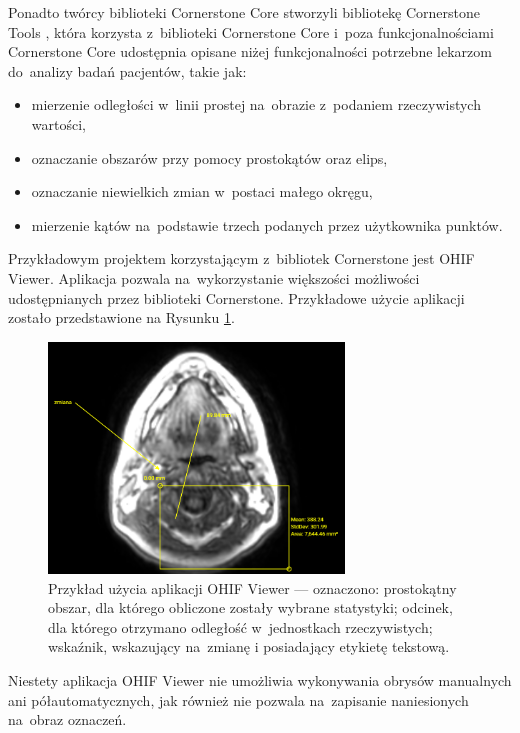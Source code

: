 \documentclass[a4paper,11pt,twoside,openright]{report}
\theoremstyle{definition}
\begin{document}
Ponadto twórcy biblioteki Cornerstone Core stworzyli bibliotekę Cornerstone Tools \cite{Cornerstone Tools},
która korzysta z~biblioteki Cornerstone Core i~poza funkcjonalnościami
Cornerstone Core udostępnia opisane niżej funkcjonalności
potrzebne lekarzom do~analizy badań pacjentów, takie jak:

\begin{itemize}[noitemsep]
\item mierzenie odległości w~linii prostej na~obrazie z~podaniem rzeczywistych wartości,
\item oznaczanie obszarów przy pomocy prostokątów oraz elips,
\item oznaczanie niewielkich zmian w~postaci małego okręgu,
\item mierzenie kątów na~podstawie trzech podanych przez użytkownika punktów.
\end{itemize}

Przykładowym projektem korzystającym z~bibliotek Cornerstone jest OHIF Viewer.
Aplikacja pozwala na~wykorzystanie większości możliwości udostępnianych przez
biblioteki Cornerstone. Przykładowe użycie aplikacji zostało przedstawione na
Rysunku \ref{fig:OHIF-example}.

\begin{figure}[b!]
	\center
	\includegraphics[width=0.7\textwidth]{OHIF-example}
	\caption{Przykład użycia aplikacji OHIF Viewer --- oznaczono: prostokątny obszar,
	dla którego obliczone zostały wybrane statystyki; odcinek, dla którego otrzymano
	odległość w~jednostkach rzeczywistych; wskaźnik, wskazujący na~zmianę i posiadający
	etykietę tekstową.}
    	\label{fig:OHIF-example}
\end{figure}

Niestety aplikacja OHIF Viewer nie umożliwia wykonywania obrysów manualnych ani półautomatycznych,
jak również nie pozwala na~zapisanie naniesionych na~obraz oznaczeń.
\end{document}
